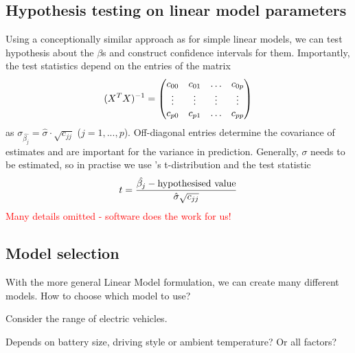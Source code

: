 \subsection{Hypothesis testing on linear model parameters}

Using a conceptionally similar approach as for simple linear models, we can test hypothesis about the $\beta$s and construct confidence intervals for them. Importantly, the test statistics depend on the entries of the matrix
\begin{align}
	(X^TX)^{-1} = \begin{pmatrix}
		c_{00} & c_{01} & \dots & c_{0p} \\ \vdots & \vdots & \vdots & \vdots \\ c_{p0} & c_{p1} & \dots & c_{pp}
	\end{pmatrix}\notag
\end{align}
as $\sigma_{\hat{\beta_j}}=\hat{\sigma}\cdot\sqrt{c_{jj}}$ ($j=1,...,p$). Off-diagonal entries determine the covariance of estimates and are important for the variance in prediction. Generally, $\sigma$ needs to be estimated, so in practise we use 's t-distribution and the test statistic
\begin{align}
	t = \frac{\hat{\beta_j}-\text{hypothesised value}}{\hat{\sigma}\sqrt{c_{jj}}} \notag
\end{align}
\textcolor{red}{Many details omitted - software does the work for us!}

\subsection{Model selection}

With the more general Linear Model formulation, we can create many different models. How to choose which model to use?

\begin{example}
	Consider the range of electric vehicles.
	\begin{center}
	\end{center}
	Depends on battery size, driving style or ambient temperature? Or all factors?
\end{example}

